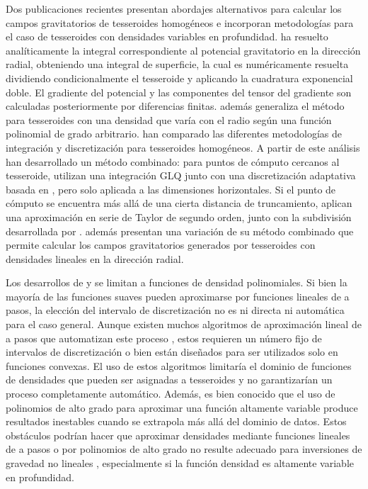 Dos publicaciones recientes presentan abordajes alternativos para calcular los
campos gravitatorios de tesseroides homogéneos e incorporan metodologías para
el caso de tesseroides con densidades variables en profundidad.
\citet{fukushima2018} ha resuelto analíticamente la integral correspondiente al
potencial gravitatorio en la dirección radial, obteniendo una integral de
superficie, la cual es numéricamente resuelta dividiendo condicionalmente el
tesseroide y aplicando la cuadratura exponencial doble.
El gradiente del potencial y las componentes del tensor del gradiente son
calculadas posteriormente por diferencias finitas.
\citet{fukushima2018} además generaliza el método para tesseroides con una
densidad que varía con el radio según una función polinomial de grado
arbitrario.
\citet{lin2019} han comparado las diferentes metodologías de integración
y discretización para tesseroides homogéneos.
A partir de este análisis han desarrollado un método combinado:
para puntos de cómputo cercanos al tesseroide, utilizan una integración
\ac{GLQ} junto con una discretización adaptativa basada en \citet{uieda2016},
pero solo aplicada a las dimensiones horizontales.
Si el punto de cómputo se encuentra más allá de una cierta distancia de
truncamiento, aplican una aproximación en serie de Taylor de segundo orden,
junto con la subdivisión desarrollada por \citet{grombein2013}.
\citet{lin2019} además presentan una variación de su método combinado que
permite calcular los campos gravitatorios generados por tesseroides con
densidades lineales en la dirección radial.

Los desarrollos de \citet{lin2019} y \citet{fukushima2018} se limitan
a funciones de densidad polinomiales.
Si bien la mayoría de las funciones suaves pueden aproximarse por funciones
lineales de a pasos, la elección del intervalo de discretización no es ni
directa ni automática para el caso general.
Aunque existen muchos algoritmos de aproximación lineal de a pasos que
automatizan este proceso \citep{ketkov1969, vandewalle1975, imamoto2008,
ahmadi2013}, estos requieren un número fijo de intervalos de discretización
o bien están diseñados para ser utilizados solo en funciones convexas.
El uso de estos algoritmos limitaría el dominio de funciones de densidades que
pueden ser asignadas a tesseroides y no garantizarían un proceso completamente
automático.
Además, es bien conocido que el uso de polinomios de alto grado para aproximar
una función altamente variable produce resultados inestables cuando se
extrapola más allá del dominio de datos.
Estos obstáculos podrían hacer que aproximar densidades mediante funciones
lineales de a pasos o por polinomios de alto grado no resulte adecuado para
inversiones de gravedad no lineales \citep[e.g.][]{uieda2017}, especialmente si
la función densidad es altamente variable en profundidad.

